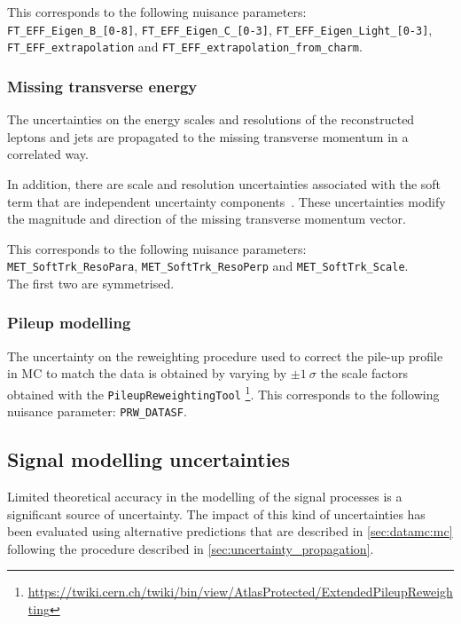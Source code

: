 This corresponds to the following nuisance parameters:\\
\texttt{FT\_EFF\_Eigen\_B\_[0-8]},  %
\texttt{FT\_EFF\_Eigen\_C\_[0-3]},  %
\texttt{FT\_EFF\_Eigen\_Light\_[0-3]},\\  %
\texttt{FT\_EFF\_extrapolation} and
\texttt{FT\_EFF\_extrapolation\_from\_charm}.


\subsubsection{Missing transverse energy}%

The uncertainties on the energy scales and resolutions of the reconstructed
leptons and jets are propagated to the missing transverse momentum
in a correlated way. 

In addition, there are scale and resolution uncertainties associated with the
soft term that are independent uncertainty components~\cite{ATLAS-CONF-2018-023}.
These uncertainties modify the magnitude and direction of the missing transverse
momentum vector.

This corresponds to the following nuisance parameters:\\
\texttt{MET\_SoftTrk\_ResoPara},
\texttt{MET\_SoftTrk\_ResoPerp} and
\texttt{MET\_SoftTrk\_Scale}.
\\The first two are symmetrised.

\subsubsection{Pileup modelling}
The uncertainty on the reweighting procedure used to correct the pile-up profile
in MC to match the data is obtained by varying by \(\pm \qty{1}{\sigma}\)
the scale factors obtained with the \texttt{PileupReweightingTool}
\footnote{\url{https://twiki.cern.ch/twiki/bin/view/AtlasProtected/ExtendedPileupReweighting}}.
This corresponds to the following nuisance parameter: \texttt{PRW\_DATASF}.

\subsection{Signal modelling uncertainties}%
\label{sec:syst:modelling}

Limited theoretical accuracy in the modelling of the signal processes
is a significant source of uncertainty. The impact of this kind of uncertainties
has been evaluated using alternative predictions that are described
in \cref{sec:datamc:mc} following the procedure described in \cref{sec:uncertainty_propagation}. 

